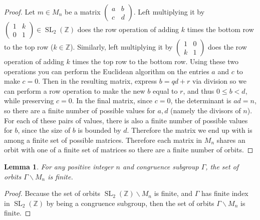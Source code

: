 \documentclass{article}
\newtheorem{lemma}[theorem]{Lemma}
\theoremstyle{definition}
\theoremstyle{definition}
\theoremstyle{definition}
\newcommand{\SLZ}{\operatorname{SL}_2(\mathbb{Z})}
\newcommand{\Mabcd}{\begin{pmatrix} a&b\\c&d \end{pmatrix}}
\begin{document}
\begin{proof}
    Let $m\in M_n$ be a matrix $\Mabcd$. Left multiplying it by $\begin{pmatrix}
        1 & k\\
        0 & 1
    \end{pmatrix}\in \SLZ$
    does the row operation of adding $k$ times the bottom row to the top row ($k\in\mathbb{Z}$). Similarly, left multiplying it by $\begin{pmatrix}
        1 & 0\\
        k & 1
    \end{pmatrix}$
    does the row operation of adding $k$ times the top row to the bottom row. Using these two operations you can perform the Euclidean algorithm on the entries $a$ and $c$ to make $c=0$. Then in the resulting matrix, express $b=qd+r$ via division so we can perform a row operation to make the new $b$ equal to $r$, and thus $0\leq b<d$, while preserving $c=0$. In the final matrix, since $c=0$, the determinant is $ad=n$, so there are a finite number of possible values for $a,d$ (namely the divisors of $n$). For each of these pairs of values, there is also a finite number of possible values for $b$, since the size of $b$ is bounded by $d$. Therefore the matrix we end up with is among a finite set of possible matrices. Therefore each matrix in $M_n$ shares an orbit with one of a finite set of matrices so there are a finite number of orbits.
\end{proof}

\begin{lemma}
    For any positive integer $n$ and congruence subgroup $\Gamma$, the set of orbits $\Gamma \backslash M_n$ is finite.
\end{lemma}
\begin{proof}
    Because the set of orbits $\SLZ \backslash M_n$ is finite, and $\Gamma$ has finite index in $\SLZ$ by being a congruence subgroup, then the set of orbits $\Gamma \backslash M_n$ is finite.
\end{proof}
\end{document}
